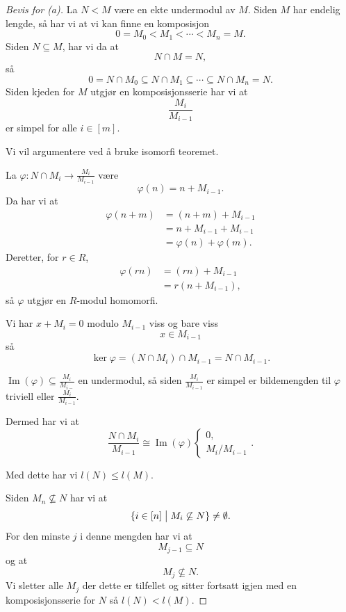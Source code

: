 \begin{proof}[Bevis for (a)]
    La $N < M$ være en ekte undermodul av $M$. 
    Siden $M$ har endelig lengde, så har vi at 
    vi kan finne en komposisjon 
    \[
        0 = M_0 < M_1 < \cdots < M_n = M. 
    \]
    Siden $N \subseteq M$, har vi da at 
    \[
        N \cap M = N, 
    \]
    så 
    \[
        0 = N \cap M_0 \subseteq N \cap M_1 \subseteq \cdots 
        \subseteq N \cap M_n = N. 
    \]
    Siden kjeden for $M$ utgjør en komposisjonsserie 
    har vi at 
    \[
        \frac{M_i}{M_{i-1}}
    \]
    er simpel for alle $i \in [m] $. 

    Vi vil argumentere 
    ved å bruke isomorfi teoremet. 

    La $\varphi : N \cap M_i \to \frac{M_i}{M_{i-1}}$ være 
    \[
        \varphi(n) = n + M_{i-1}. 
    \]
    Da har vi at 
    \begin{align*}
        \varphi(n + m) 
        &= (n + m) + M_{i-1} \\ 
        &= n + M_{i-1} + M_{i-1} \\ 
        &= \varphi(n) + \varphi(m). 
    \end{align*}
    Deretter, for $r \in R$, 
    \begin{align*}
        \varphi(rn) 
        &= (rn) + M_{i-1} \\ 
        &= r (n + M_{i-1}), 
    \end{align*}
    så $\varphi$ utgjør en $R$-modul 
    homomorfi. 

    Vi har $x + M_i = 0$ modulo $M_{i-1}$ viss og bare 
    viss 
    \[
        x \in M_{i-1}
    \]
    så 
    \[
        \ker \varphi = (N\cap M_i) \cap M_{i-1} 
        = N \cap M_{i-1}.
    \]

    $\operatorname{Im}(\varphi) \subseteq \frac{M_i}{M_{i-}}$ 
    en undermodul, så siden $\frac{M_i}{M_{i-1}}$ er 
    simpel er bildemengden til $\varphi$ triviell eller 
    $\frac{M_i}{M_{i-1}}$. 

    Dermed har vi at 
    \[
        \frac{N \cap M_i}{M_{i-1}} 
        \cong 
        \operatorname{Im}(\varphi) 
        \begin{cases}
            0, \\ 
            M_{i}/M_{i-1}
        \end{cases}.
    \]
    
    Med dette har vi $l(N) \leq l(M)$. 
    
    Siden $M_n \not\subseteq N$ har vi at 
    \[
        \{i \in [n] \bigm| M_i \not\subseteq N\} \neq \emptyset.  
    \]
    For den minste $j$ i denne mengden har vi at 
    \[
        M_{j-1} \subseteq N 
    \]
    og at 
    \[
        M_j \not\subseteq N. 
    \]
    Vi sletter alle $M_j$ der dette er tilfellet og 
    sitter fortsatt igjen med en komposisjonsserie for 
    $N$ så $l(N) < l(M)$.
\end{proof}

